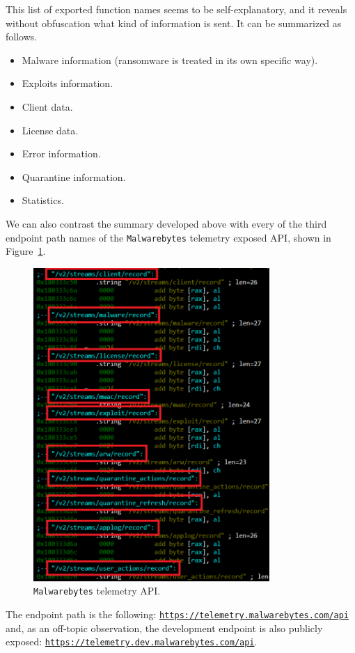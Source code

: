 This list of exported function names seems to be self-explanatory, and it
reveals without obfuscation what kind of information is sent. It can be
summarized as follows.
\begin{itemize}
\item Malware information (ransomware is treated in its own specific way).
\item Exploits information.
\item Client data.
\item License data.
\item Error information.
\item Quarantine information.
\item Statistics.
\end{itemize}
We can also contrast the summary developed above with every of the third endpoint path
names of the \texttt{Malwarebytes} telemetry exposed API, shown in Figure~\ref{fig:api}.
\begin{figure}[t]
  \centering
  \includegraphics[width=0.80\textwidth]{./figures/Malwarebytes}
  \caption{\label{fig:api} \texttt{Malwarebytes} telemetry API.}
\end{figure}
The endpoint path is the following:
\href{https://telemetry.malwarebytes.com/api}{\texttt{https://telemetry.malwarebytes.com/api}}
and, as an off-topic observation, the development endpoint is also publicly
exposed:
\href{https://telemetry.dev.malwarebytes.com/api}{\texttt{https://telemetry.dev.malwarebytes.com/api}}. 

